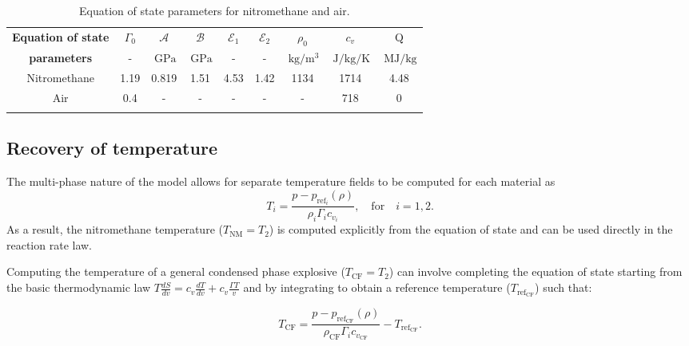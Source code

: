 \documentclass[3p,times,twocolumn]{elsarticle}
\begin{document}
\begin{table*}[!t]
\centering
\caption{Equation of state parameters for  nitromethane and air.}
\label{EoSNMAir}
 \begin{tabular}{ccccccccc}
 \hline\noalign{\smallskip}
\footnotesize \textbf{Equation of state} & $\Gamma_0$ & $\mathcal{A}$  & $\mathcal{B}$   & $\mathcal{E}_1$  & $\mathcal{E}_2$ & $\rho_0$  & $c_v $  & Q  \\ 
\footnotesize \textbf{parameters} &-  &$\SI{}{\giga \pascal}$  &$\SI{}{\giga \pascal}$  &- & - &$\SI{}{\kilogram \per \meter \tothe{3}}$ &  $\SI{}{\joule \per \kilogram \per \kelvin}$ & $\SI{}{\mega \joule \per \kilogram }$ \\ 
\noalign{\smallskip}\hline\noalign{\smallskip}
\footnotesize Nitromethane & 1.19 & 0.819 & 1.51  & 4.53 &  1.42 &  1134 & 1714 & 4.48  \\
\footnotesize Air & 0.4 & - & -  & - & - &  - & 718 & 0  \\
\noalign{\smallskip}\hline
\end{tabular}
\end{table*}





\subsection{Recovery of temperature}


The multi-phase nature of the model allows for separate temperature fields to be computed for each material as
\begin{equation}
T_i=\frac{p-p_{\text{ref}_i}(\rho)}{\rho_i\Gamma_ic_{v_i}}, \quad \mbox{for} \quad  i=1,2.
\label{temp}
\end{equation} 
As a result, the nitromethane temperature ($T_{\text{NM}}=T_2$) is computed explicitly from the equation of state and can be used directly in the reaction rate law.

Computing the temperature of a general condensed phase explosive ($T_{\text{CF}}=T_2$) can involve completing the equation of state starting from the basic thermodynamic law $T \frac{dS}{dv}=c_v\frac{dT}{dv}+c_v\frac{\Gamma T}{v}$ and by integrating to obtain a reference temperature ($T_{{\text{ref}_\text{{CF}}}}$) such that:

\begin{equation}
T_{\text{CF}}=\frac{p-p_{{\text{ref}_\text{{CF}}}}(\rho)}{\rho_{\text{CF}}\Gamma_ic_{v_\text{CF}}} - T_{{\text{ref}_\text{{CF}}}}.
\label{tempref}
\end{equation} 
\end{document}
